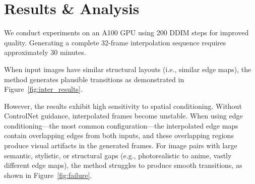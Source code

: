 \documentclass{article}
\begin{document}
\section{Results \& Analysis}
  We conduct experiments on an A100 GPU using 200 DDIM steps for    
  improved quality. Generating a complete 32-frame interpolation
  sequence requires approximately 30 minutes.                       
                                                            
  When input images have similar structural layouts (i.e., similar
  edge maps), the method generates plausible transitions as
  demonstrated in Figure~\ref{fig:inter_results}.

  However, the results exhibit high sensitivity to spatial
  conditioning. Without ControlNet guidance, interpolated frames
  become unstable. When using edge conditioning—the most common
  configuration—the interpolated edge maps contain overlapping edges
   from both inputs, and these overlapping regions produce visual
  artifacts in the generated frames. For image pairs with large
  semantic, stylistic, or structural gaps (e.g., photorealistic to
  anime, vastly different edge maps), the method struggles to
  produce smooth transitions, as shown in Figure~\ref{fig:failure}.
\end{document}
